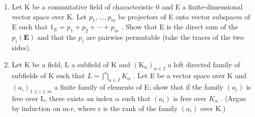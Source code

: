 \begin{enumerate}
\def\labelenumi{\arabic{enumi}.}
\setcounter{enumi}{37}
\item
  Let K be a commutative field of characteristic 0 and E a finite-dimensional vector space over K. Let \(p_{1}, \ldots, p_{m}\) be projectors of E onto vector subspaces of E such that \(1_{E} = p_{1} + p_{2} + \cdots + p_{m}\) . Show that E is the direct sum of the \(p_i(\mathbf{E})\) and that the \(p_i\) are pairwise permutable (take the traces of the two sides).
\item
  Let K be a field, L a subfield of K and \((\mathrm{K}_{\alpha})_{\alpha\in I}\) a left directed family of subfields of K such that \(L=\bigcap_{\alpha\in I}K_{\alpha}\) . Let E be a vector space over K and \((a_{i})_{1\leqslant i\leqslant m}\) a finite family of elements of E; show that if the family \((a_{i})\) is free over L, there exists an index \(\alpha\) such that \((a_{i})\) is free over \(K_{\alpha}\) . (Argue by induction on m-r, where r is the rank of the family \((a_{i})\) over K.)
\end{enumerate}

